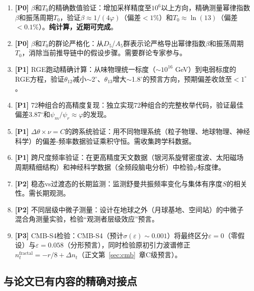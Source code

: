 \documentclass[12pt,a4paper,twocolumn]{article}
\renewcommand{\phi}{\varphi}
\begin{document}
\begin{enumerate}
\item \textbf{[P0]} $\beta$和$T_0$的精确数值验证：增加采样精度至$10^6$以上方向，精确测量幂律指数$\beta$和振荡周期$T_0$，验证$\beta \approx 1/(4\phi)$（偏差$<1\%$）和$T_0 \approx \ln(13)$（偏差$<0.1\%$）。\textbf{纯计算，近期可完成}。

\item \textbf{[P0]} $\beta$和$T_0$的群论严格化：从$D_5$/$A_5$群表示论严格导出幂律指数$\beta$和振荡周期$T_0$，消除当前推导链中的假设步骤。需要群论专家参与。

\item \textbf{[P1]} RGE跑动精确计算：从味物理统一标度（$\sim 10^{16}$ GeV）到电弱标度的RGE方程，验证$\theta_{12}$减小$\sim$2$^\circ$、$\theta_{13}$增大$\sim$1.8$^\circ$的预言方向，预期偏差收敛至$<1^\circ$。

\item \textbf{[P1]} 72种组合的高精度复现：独立实现72种组合的完整枚举代码，验证最佳偏差3.87$^\circ$和$\psi_m/\psi_r \approx \phi$的发现。

\item \textbf{[P1]} $\Delta\theta \times \nu = C$的跨系统验证：用不同物理系统（粒子物理、地球物理、神经科学）的偏差-频率数据验证乘积守恒。需收集跨学科数据。

\item \textbf{[P1]} 跨尺度频率验证：在更高精度天文数据（银河系旋臂密度波、太阳磁场周期精细结构）和神经科学数据（全频段脑电分析）中检验$\phi$标度律。

\item \textbf{[P2]} 稳态vs过渡态的长期监测：监测舒曼共振频率变化与集体有序度$S$的相关性。需长期观测。

\item \textbf{[P2]} 不同层级中微子测量：设计在地球之外（月球基地、空间站）的中微子混合角测量实验，检验``观测者层级效应''预言。

\item \textbf{[P3]} CMB-S4检验：CMB-S4（预计$\sigma(\varepsilon) \sim 0.001$）将最终区分$\varepsilon = 0$（零假设）与$\varepsilon = 0.058$（分形预言），同时检验原初引力波谱修正$n_t^{\text{fractal}} = -r/8 + \Delta n_t$（正文第~\ref{sec:cmb}~章C级预言）。
\end{enumerate}

\subsection{与论文已有内容的精确对接点}
\label{subsec:docking_points}
\end{document}
